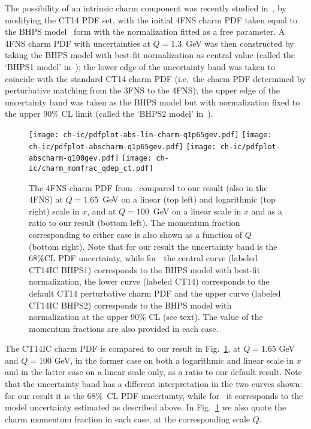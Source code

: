 The possibility of an intrinsic charm component was recently studied
in~\cite{Hou:2017khm}, by modifying the CT14 PDF set, with the
initial 4FNS charm PDF taken equal to the BHPS
model~\cite{Brodsky:1980pb} form with the normalization fitted as a
free parameter.
%
A 4FNS  charm PDF with uncertainties at $Q=1.3$~GeV was then
constructed by taking 
the BHPS model with best-fit normalization as central value (called
the `BHPS1 model' in~\cite{Hou:2017khm}); the lower
edge of the uncertainty band was taken to coincide with the standard
CT14 charm PDF  (i.e.\ the charm PDF determined by perturbative
matching from the 3FNS to the 4FNS); the upper edge of the uncertainty
band was taken as 
the BHPS model but with  normalization fixed to the upper  90\% CL limit (called the
`BHPS2 model' in~\cite{Hou:2017khm}).

\begin{figure}[h]
  \begin{center}
    \texttt{[image: ch-ic/pdfplot-abs-lin-charm-q1p65gev.pdf]}
    \texttt{[image: ch-ic/pdfplot-abscharm-q1p65gev.pdf]}
    \texttt{[image: ch-ic/pdfplot-abscharm-q100gev.pdf]}	
    \texttt{[image: ch-ic/charm\_momfrac\_qdep\_ct.pdf]}
    \caption{\small The 4FNS charm PDF
    from~\cite{Hou:2017khm} compared to our result (also in the 4FNS) 
     at $Q=1.65$~GeV on
    a linear (top left) and logarithmic (top right) scale in $x$, and
    at  $Q=100$~GeV on a linear scale in $x$ and as a ratio to our result
    (bottom left).
    The momentum fraction corresponding to either case
    is also shown as a function of $Q$ (bottom right). Note that for
    our result the uncertainty band is the 68\%CL PDF uncertainty,
    while for~\cite{Hou:2017khm} the central curve (labeled
    CT14IC BHPS1) corresponds to the BHPS model with best-fit
    normalization, the lower curve (labeled
    CT14) corresponds to the default CT14 perturbative charm PDF and
    the upper curve (labeled
    CT14IC BHPS2) corresponds to the BHPS model with normalization at
    the upper 90\% CL (see text). The value of the momentum fractions
    are also provided in each case.
  \label{fig:ic/comparison_CT14} }
\end{center}
\end{figure}

The CT14IC charm PDF is compared to our result in
Fig.~\ref{fig:ic/comparison_CT14}, at  $Q=1.65$ GeV and $Q=100$ GeV, in
the former case on both a logarithmic and linear scale in $x$ and in
the latter case on a linear scale only, as a ratio to our default
result.
%
Note that the uncertainty band has a different interpretation in the
two curves shown: for our result it is the 68\%~CL PDF uncertainty,
while for~\cite{Hou:2017khm}  it corresponds to the model
uncertainty estimated as described above.
%
In Fig.~\ref{fig:ic/comparison_CT14} we also quote
the charm momentum fraction in each case, at the corresponding scale $Q$. 

